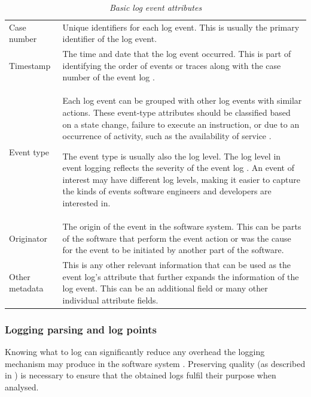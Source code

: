 \begin{table}[!htb]
	\centering
	\caption[Basic log event attributes]
	{\textit{Basic log event attributes \cite{Bekeneva2020}}}
	\label{tbl:ch1_logBasicAttributes}
	\begin{tabularx}{\textwidth}{lX}
		\toprule 
		\thead{Attribute} & \thead{Description} \\
		\midrule

		\rowcolor{lightgray}
		Case number & Unique identifiers for each log event. This is usually the primary identifier of the log event. \\

		Timestamp & The time and date that the log event occurred. This is part of identifying the order of events or traces along with the case number of the event log \cite{Kherbouche2017}. \\

		\rowcolor{lightgray}
		Event type & Each log event can be grouped with other log events with similar actions. These event-type attributes should be classified based on a state change, failure to execute an instruction, or due to an occurrence of activity, such as the availability of service \cite{Fedaghi2010}. \par The event type is usually also the log level. The log level in event logging reflects the severity of the event log \cite{Rong2020}. An event of interest may have different log levels, making it easier to capture the kinds of events software engineers and developers are interested in. \\

		Originator & The origin of the event in the software system. This can be parts of the software that perform the event action or was the cause for the event to be initiated by another part of the software. \\

		\rowcolor{lightgray}
		Other metadata & This is any other relevant information that can be used as the event log's attribute that further expands the information of the log event. This can be an additional field or many other individual attribute fields.\\
		\bottomrule
	\end{tabularx}
\end{table}

\clearpage

\subsubsection{Logging parsing and log points}\label{sec:ch1_loggignPoints}
Knowing what to log can significantly reduce any overhead the logging mechanism may produce in the software system \cite{Jia2018, Pecchia2015}. Preserving quality (as described in ) is necessary to ensure that the obtained logs fulfil their purpose when analysed.

